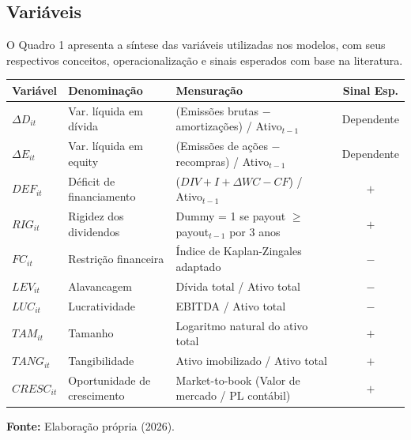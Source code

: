\documentclass[a4paper,12pt]{article}
\begin{document}
\subsection{Variáveis}
 
O Quadro 1 apresenta a síntese das variáveis utilizadas nos modelos, com seus respectivos conceitos, operacionalização e sinais esperados com base na literatura.

\begin{quadro}[H]
    \caption{Definição Operacional das Variáveis}
    \centering
    \label{qua:variaveis}
    \small
    \begin{tabular}{|p{2cm}|p{4cm}|p{5.5cm}|c|} 
        \hline
        \textbf{Variável} & \textbf{Denominação} & \textbf{Mensuração} & \textbf{Sinal Esp.} \\
        \hline
        $\Delta D_{it}$ & Var. líquida em dívida & (Emissões brutas $-$ amortizações) / Ativo$_{t-1}$ & Dependente \\
        \hline
        $\Delta E_{it}$ & Var. líquida em equity & (Emissões de ações $-$ recompras) / Ativo$_{t-1}$ & Dependente \\
        \hline
        $DEF_{it}$ & Déficit de financiamento & ($DIV + I + \Delta WC - CF$) / Ativo$_{t-1}$ & $+$ \\
        \hline
        $RIG_{it}$ & Rigidez dos dividendos & Dummy = 1 se payout $\geq$ payout$_{t-1}$ por 3 anos & $+$ \\
        \hline
        $FC_{it}$ & Restrição financeira & Índice de Kaplan-Zingales adaptado & $-$ \\
        \hline
        $LEV_{it}$ & Alavancagem & Dívida total / Ativo total & $-$ \\
        \hline
        $LUC_{it}$ & Lucratividade & EBITDA / Ativo total & $-$ \\
        \hline
        $TAM_{it}$ & Tamanho & Logaritmo natural do ativo total & $+$ \\
        \hline
        $TANG_{it}$ & Tangibilidade & Ativo imobilizado / Ativo total & $+$ \\
        \hline
        $CRESC_{it}$ & Oportunidade de crescimento & Market-to-book (Valor de mercado / PL contábil) & $+$ \\
        \hline
    \end{tabular}
    
    \vspace{0.2cm}
    {\raggedright \footnotesize \textbf{Fonte:} Elaboração própria (2026).\par}
\end{quadro}
 
\end{document}
